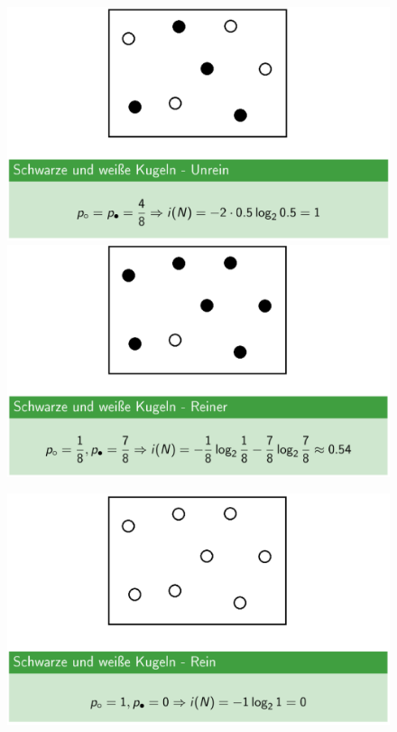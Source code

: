 \documentclass{report}
\begin{document}
\begin{figure}[H]
  \centering
  \begin{minipage}[b]{0.4\textwidth}
    \includegraphics[scale=.2]{ml07_3}
  \end{minipage}
  \begin{minipage}[b]{0.4\textwidth}
    \includegraphics[scale=.2]{ml07_4}
  \end{minipage}
\end{figure}

\begin{figure}[H]
  \centering
  \begin{minipage}[b]{0.4\textwidth}
    \includegraphics[scale=.2]{ml07_5}
  \end{minipage}
\end{figure}
\end{document}
